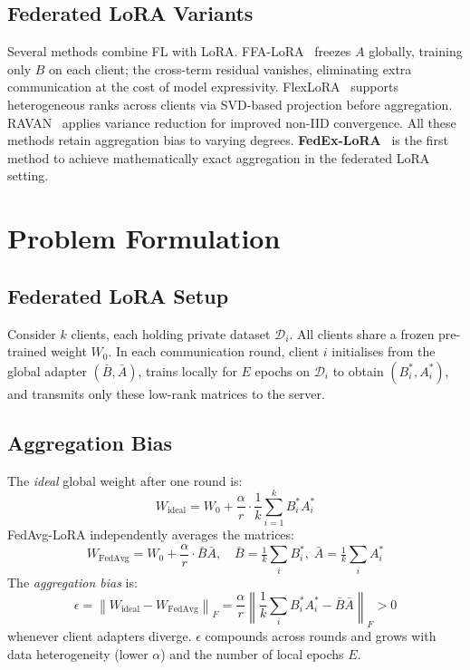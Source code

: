 \documentclass[conference]{IEEEtran}
\begin{document}
\subsection{Federated LoRA Variants}
Several methods combine FL with LoRA. FFA-LoRA~\cite{b_ffalora} freezes $A$
globally, training only $B$ on each client; the cross-term residual vanishes,
eliminating extra communication at the cost of model expressivity.
FlexLoRA~\cite{b_flexlora} supports heterogeneous ranks across clients via
SVD-based projection before aggregation. RAVAN~\cite{b_ravan} applies variance
reduction for improved non-IID convergence. All these methods retain
aggregation bias to varying degrees.
\textbf{FedEx-LoRA}~\cite{b_singhal} is the first method to achieve
mathematically exact aggregation in the federated LoRA setting.

\section{Problem Formulation}
\label{sec:problem}

\subsection{Federated LoRA Setup}
Consider $k$ clients, each holding private dataset $\mathcal{D}_i$. All
clients share a frozen pre-trained weight $W_0$. In each communication round,
client $i$ initialises from the global adapter $(\bar{B}, \bar{A})$, trains
locally for $E$ epochs on $\mathcal{D}_i$ to obtain $(B_i^*, A_i^*)$, and
transmits only these low-rank matrices to the server.

\subsection{Aggregation Bias}
The \emph{ideal} global weight after one round is:
\begin{equation}
  W_{\mathrm{ideal}} = W_0 + \frac{\alpha}{r}\cdot\frac{1}{k}\sum_{i=1}^k B_i^* A_i^*
  \label{eq:ideal}
\end{equation}
FedAvg-LoRA independently averages the matrices:
\begin{equation}
  W_{\mathrm{FedAvg}} = W_0 + \frac{\alpha}{r}\cdot\bar{B}\bar{A},
  \quad \bar{B}=\tfrac{1}{k}\textstyle\sum_i B_i^*,\;
        \bar{A}=\tfrac{1}{k}\textstyle\sum_i A_i^*
  \label{eq:fedavg}
\end{equation}
The \emph{aggregation bias} is:
\begin{equation}
  \epsilon = \left\|W_{\mathrm{ideal}} - W_{\mathrm{FedAvg}}\right\|_F
           = \frac{\alpha}{r}\left\|\frac{1}{k}\sum_i B_i^* A_i^*
             - \bar{B}\bar{A}\right\|_F > 0
  \label{eq:bias}
\end{equation}
whenever client adapters diverge. $\epsilon$ compounds across rounds and grows
with data heterogeneity (lower $\alpha$) and the number of local epochs $E$.
\end{document}
